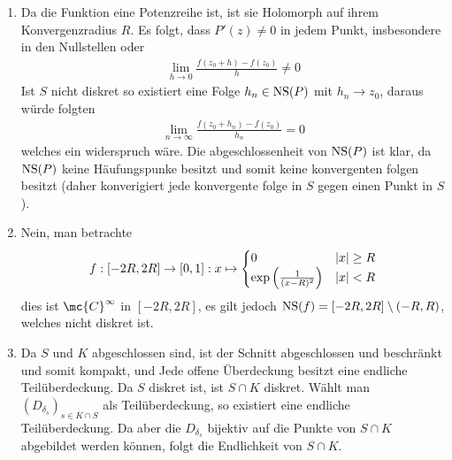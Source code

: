 \documentclass[ngerman]{report}
\begin{document}
\begin{answer}\hspace{\linewidth}
    \begin{enumerate}
        \item Da die Funktion eine Potenzreihe ist, ist sie Holomorph auf ihrem Konvergenzradius $R$. Es folgt, dass $P'(z)\neq 0$ in jedem Punkt, insbesondere in den Nullstellen oder
        \begin{align*}
            \lim_{h\to 0} \frac{f(z_0+h)-f(z_0)}{h} \neq 0
        \end{align*}
        Ist $S$ nicht diskret so existiert eine Folge $h_n\in \operatorname{\text{NS}}(P)$ mit $h_n \to z_0$, daraus würde folgten
        \begin{align*}
            \lim_{n\to \infty} \frac{f(z_0+h_n)-f(z_0)}{h_n} = 0
        \end{align*}
        welches ein widerspruch wäre. Die abgeschlossenheit von $\operatorname{\text{NS}}(P)$ ist klar, da $\operatorname{\text{NS}}(P)$ keine Häufungspunke besitzt und somit keine konvergenten folgen besitzt (daher konverigiert jede konvergente folge in $S$ gegen einen Punkt in $S$).
        \item Nein, man betrachte
        \begin{align*}
            f:[-2R,2R] \to [0,1]: x\mapsto \begin{cases}
                0 & \left|x\right|\geq R\\
                \exp\left(\frac{1}{(x-R)^2}\right) & \left|x\right|<R
            \end{cases}
        \end{align*}
        dies ist $\mc{C}^\infty$ in $[-2R,2R]$, es gilt jedoch $\operatorname{\text{NS}}(f) = [-2R,2R]\setminus(-R,R)$, welches nicht diskret ist.
        \item Da $S$ und $K$ abgeschlossen sind, ist der Schnitt abgeschlossen und beschränkt und somit kompakt, und Jede offene Überdeckung besitzt eine endliche Teilüberdeckung. Da $S$ diskret ist, ist $S\cap K$ diskret. Wählt man $(D_{\delta_s})_{s\in K\cap S}$ als Teilüberdeckung, so existiert eine endliche Teilüberdeckung. Da aber die $D_{\delta_s}$ bijektiv auf die Punkte von $S\cap K$ abgebildet werden können, folgt die Endlichkeit von $S\cap K$.
    \end{enumerate}
\end{answer}
\newpage
\end{document}

